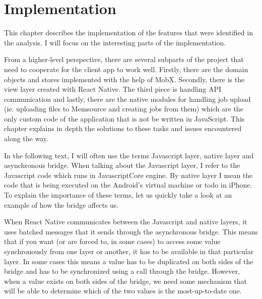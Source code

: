 \chapter{Implementation}

This chapter describes the implementation of the features that were identified in the analysis. I will focus on the interesting parts of the implementation.

From a higher-level perspective, there are several subparts of the project that need to cooperate for the client app to work well. Firstly, there are the domain objects and stores implemented with the help of MobX. Secondly, there is the view layer created with React Native. The third piece is handling API communication and lastly, there are the native modules for handling job upload (ie. uploading files to Memsource and creating jobs from them) which are the only custom code of the application that is not be written in JavaScript. This chapter explains in depth the solutions to these tasks and issues encountered along the way.


In the following text, I will often use the terms Javascript layer, native layer and asynchronous bridge. When talking about the Javascript layer, I refer to the Javascript code which runs in JavascriptCore engine. By native layer I mean the code that is being executed on the Android’s virtual machine or todo in iPhone. To explain the importance of these terms, let us quickly take a look at an example of how the bridge affects us. 

When React Native communicates between the Javascript and native layers, it uses batched messages that it sends through the asynchronous bridge. This means that if you want (or are forced to, in some cases) to access some value synchronously from one layer or another, it has to be available in that particular layer. In some cases this means a value has to be duplicated on both sides of the bridge and has to be synchronized using a call through the bridge. However, when a value exists on both sides of the bridge, we need some mechanism that will be able to determine which of the two values is the most-up-to-date one. 

